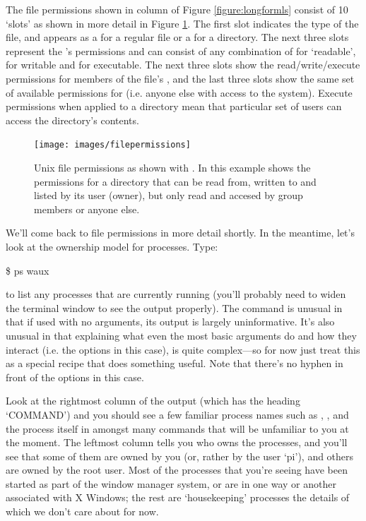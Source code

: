 The file permissions shown in column \protect{} of Figure
\ref{figure:longformls} consist of 10 `slots' as shown in more detail
in Figure \ref{figure:fileperms}. The first slot indicates the type of
the file, and appears as a \ttout{-} for a regular file or a 
for a directory. The next three slots represent the 's
permissions and can consist of any combination of  for
`readable',  for writable and  for executable. The
next three slots show the read/write/execute permissions for members
of the file's , and the last three slots show the same
set of available permissions for  (i.e. anyone else
with access to the system). Execute permissions when applied to a
directory mean that particular set of users can access the directory's
contents.

\begin{figure}
\centerline{\texttt{[image: images/filepermissions]}}
\caption{Unix file permissions as shown with . In this example shows the permissions for a directory that can be read from, written to and listed by its user (owner), but only read and accesed by group members or anyone else.}\label{figure:fileperms}
\end{figure}

We'll come back to file permissions in more detail shortly. In the
meantime, let's look at the ownership model for processes. Type:

\begin{ttoutenv}
\$ ps waux
\end{ttoutenv}

to list any processes that are currently running (you'll probably need to widen the terminal window to see the output properly). The  command is unusual in that if used with no arguments, its output is largely uninformative. It's also unusual in that explaining what even the most basic arguments do and how they interact (i.e. the  options in this case), is quite complex---so for now just treat this as a special recipe that does something useful. Note that there's no hyphen in front of the options in this case.

Look at the rightmost column of the output (which has the heading `COMMAND') and you should see a few familiar process names such as , , and the  process itself in amongst many commands that will be unfamiliar to you at the moment. The leftmost column tells you who owns the processes, and you'll see that some of them are owned by you (or, rather by the user `pi'), and others are owned by the root user. Most of the processes that you're seeing have been started as part of the window manager system, or are in one way or another associated with X Windows; the rest are `housekeeping' processes the details of which we don't care about for now.

